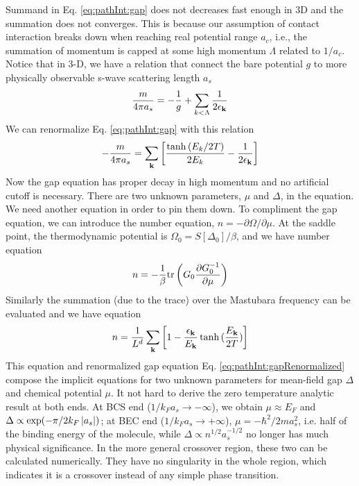Summand in Eq. \ref{eq:pathInt:gap} does not decreases fast enough in 3D and the summation does not converges.  This is because our assumption of contact interaction breaks down when reaching real potential range $a_{c}$, i.e., the summation of momentum is capped at some high momentum $\Lambda$ related to $1/a_{c}$.  Notice that in 3-D, we have a relation that connect the bare potential $g$ to more physically observable s-wave scattering length $a_{s}$
\begin{equation}\label{eq:pathInt:as}
\frac{m}{4\pi{}a_{s}}=-\frac{1}{g}+\sum_{k<\Lambda}\frac{1}{2\epsilon_{\mathbf{k}}}
\end{equation}
We can renormalize Eq. \ref{eq:pathInt:gap} with this relation
\begin{equation}\label{eq:pathInt:gapRenormalized}
-\frac{m}{4\pi{}a_{s}}=\sum_{\mathbf{k}}\left[\frac{\tanh{(E_k/2T)}}{2E_k}-\frac{1}{2\epsilon_{\mathbf{k}}}\right]
\end{equation}
Now the gap equation has proper decay in high momentum and no artificial cutoff is necessary.  There are two unknown parameters, $\mu$ and $\Delta$,  in the equation.  We need another equation in order to pin them down. To compliment the gap equation, we can introduce the number equation, $n=-\partial\Omega/\partial\mu$. At the saddle point, the thermodynamic potential is $\Omega_{0}=S[\Delta_{0}]/\beta$, and we have number equation
\begin{equation*}
n=-\frac{1}{\beta}\text{tr}\left({G_{0}\frac{\partial{G_{0}^{-1}}}{\partial{\mu}}}\right)
\end{equation*}
Similarly the summation (due to the trace) over the Mastubara frequency can be evaluated and we have equation
\begin{equation}
n=\frac{1}{L^{d}}\sum_{\mathbf{k}}\left[1-\frac{\epsilon_{\mathbf{k}}}{E_{\mathbf{k}}}\tanh{(\frac{E_{\ensuremath{\mathbf{k}}}}{2T})}\right]
\end{equation}
This equation and renormalized gap equation Eq. \ref{eq:pathInt:gapRenormalized} compose the implicit equations for two unknown parameters for mean-field gap $\Delta$ and chemical potential $\mu$.  It not hard to derive the zero temperature analytic result at both ends.  At BCS end ($1/k_{F}a_{s}\rightarrow-\infty$), we obtain $\mu\approx{}E_{F}$ and $\Delta\propto\exp(-\pi/2k_{F}\left\lvert{a_{s}}\right\rvert)$; at BEC end ($1/k_{F}a_{s}\rightarrow+\infty$),  $\mu=-\hbar^{2}/2ma_{s}^{2}$, i.e. half of the binding energy of the molecule, while $\Delta\propto{}n^{1/2}a_{s}^{-1/2}$ no longer has  much physical significance.  In the more general crossover region, these two  can be calculated numerically.  They have no singularity in the whole region, which indicates it is a crossover instead of any simple phase transition.  



